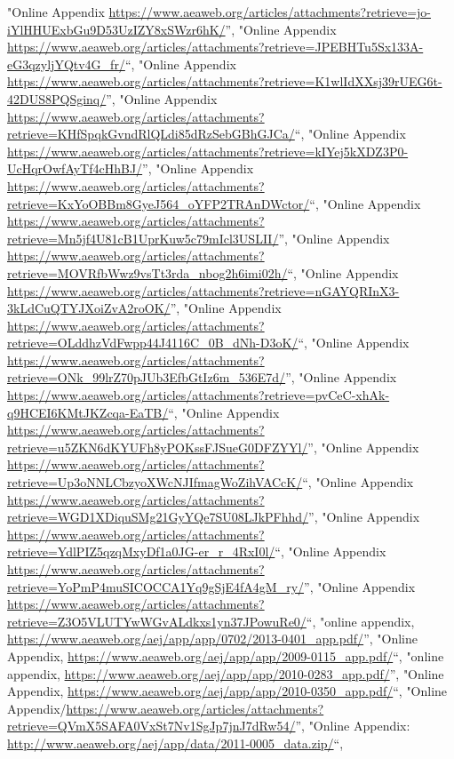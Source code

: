 \documentclass[]{article}
\begin{document}
\begin{itemize}
  "Online Appendix
  \url{https://www.aeaweb.org/articles/attachments?retrieve=jo-iYlHHUExbGu9D53UzIZY8xSWzr6hK/}'',
  "Online Appendix
  \url{https://www.aeaweb.org/articles/attachments?retrieve=JPEBHTu5Sx133A-eG3qzyljYQtv4G_fr/}``,
  "Online Appendix
  \url{https://www.aeaweb.org/articles/attachments?retrieve=K1wlIdXXsj39rUEG6t-42DUS8PQSginq/}'',
  "Online Appendix
  \url{https://www.aeaweb.org/articles/attachments?retrieve=KHfSpqkGvndRlQLdi85dRzSebGBhGJCa/}``,
  "Online Appendix
  \url{https://www.aeaweb.org/articles/attachments?retrieve=kIYej5kXDZ3P0-UcHqrOwfAyTf4cHhBJ/}'',
  "Online Appendix
  \url{https://www.aeaweb.org/articles/attachments?retrieve=KxYoOBBm8GyeJ564_oYFP2TRAnDWctor/}``,
  "Online Appendix
  \url{https://www.aeaweb.org/articles/attachments?retrieve=Mn5jf4U81cB1UprKuw5c79mIcl3USLII/}'',
  "Online Appendix
  \url{https://www.aeaweb.org/articles/attachments?retrieve=MOVRfbWwz9vsTt3rda_nbog2h6imi02h/}``,
  "Online Appendix
  \url{https://www.aeaweb.org/articles/attachments?retrieve=nGAYQRInX3-3kLdCuQTYJXoiZvA2roOK/}'',
  "Online Appendix
  \url{https://www.aeaweb.org/articles/attachments?retrieve=OLddhzVdFwpp44J4116C_0B_dNh-D3oK/}``,
  "Online Appendix
  \url{https://www.aeaweb.org/articles/attachments?retrieve=ONk_99lrZ70pJUb3EfbGtIz6m_536E7d/}'',
  "Online Appendix
  \url{https://www.aeaweb.org/articles/attachments?retrieve=pvCeC-xhAk-q9HCEI6KMtJKZcqa-EaTB/}``,
  "Online Appendix
  \url{https://www.aeaweb.org/articles/attachments?retrieve=u5ZKN6dKYUFh8yPOKssFJSueG0DFZYYl/}'',
  "Online Appendix
  \url{https://www.aeaweb.org/articles/attachments?retrieve=Up3oNNLCbzyoXWcNJIfmagWoZihVACcK/}``,
  "Online Appendix
  \url{https://www.aeaweb.org/articles/attachments?retrieve=WGD1XDiquSMg21GyYQe7SU08LJkPFhhd/}'',
  "Online Appendix
  \url{https://www.aeaweb.org/articles/attachments?retrieve=YdlPIZ5qzqMxyDf1a0JG-er_r_4RxI0l/}``,
  "Online Appendix
  \url{https://www.aeaweb.org/articles/attachments?retrieve=YoPmP4muSICOCCA1Yq9gSjE4fA4gM_ry/}'',
  "Online Appendix
  \url{https://www.aeaweb.org/articles/attachments?retrieve=Z3O5VLUTYwWGvALdkxs1yn37JPowuRe0/}``,
  "online appendix,
  \url{https://www.aeaweb.org/aej/app/app/0702/2013-0401_app.pdf/}'',
  "Online Appendix,
  \url{https://www.aeaweb.org/aej/app/app/2009-0115_app.pdf/}``, "online
  appendix,
  \url{https://www.aeaweb.org/aej/app/app/2010-0283_app.pdf/}'', "Online
  Appendix,
  \url{https://www.aeaweb.org/aej/app/app/2010-0350_app.pdf/}``, "Online
  Appendix/\url{https://www.aeaweb.org/articles/attachments?retrieve=QVmX5SAFA0VxSt7Nv1SgJp7jnJ7dRw54/}'',
  "Online Appendix:
  \url{http://www.aeaweb.org/aej/app/data/2011-0005_data.zip/}``,

\end{itemize}
\end{document}
